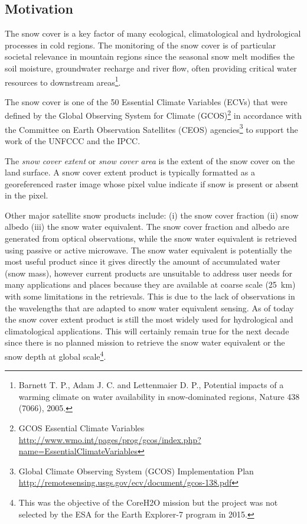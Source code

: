 \documentclass[a4paper]{article}
\begin{document}
\subsection{Motivation}

The snow cover is a key factor of many ecological, climatological and hydrological processes in cold regions. The monitoring of the snow cover is of particular societal relevance in mountain regions since the seasonal snow melt modifies the soil moisture, groundwater recharge and river flow, often providing critical water resources to downstream areas\footnote{Barnett T. P., Adam J. C. and Lettenmaier D. P., Potential impacts of a warming climate on water availability in snow-dominated regions, Nature 438 (7066), 2005.}. 

The snow cover is one of the 50 Essential Climate Variables (ECVs) that were defined by the Global Observing System for Climate (GCOS)\footnote{GCOS Essential Climate Variables  \url{http://www.wmo.int/pages/prog/gcos/index.php?name=EssentialClimateVariables}} in accordance with the Committee on Earth Observation Satellites (CEOS) agencies\footnote{Global Climate Observing System (GCOS) Implementation Plan \url{http://remotesensing.usgs.gov/ecv/document/gcos-138.pdf}} to support the work of the UNFCCC and the IPCC. 

The \textit{snow cover extent} or \textit{snow cover area} is the extent of the snow cover on the land surface. A snow cover extent product is typically formatted as a georeferenced raster image whose pixel value indicate if snow is present or absent in the pixel.

Other major satellite snow products include: (i) the snow cover fraction (ii) snow albedo (iii) the snow water equivalent. The snow cover fraction and albedo are generated from optical observations, while the snow water equivalent is retrieved using passive or active microwave. The snow water equivalent is potentially the most useful product since it gives directly the amount of accumulated water (snow mass), however current products are unsuitable to address user needs for many applications and places because they are available at coarse scale (25~km) with some limitations in the retrievals. This is due to the lack of observations in the wavelengths that are adapted to snow water equivalent sensing. As of today the snow cover extent product is still the most widely used for hydrological and climatological applications. This will certainly remain true for the next decade since there is no planned mission to retrieve the snow water equivalent or the snow depth at global scale\footnote{This was the objective of the CoreH2O mission but the project was not selected by the ESA for the Earth Explorer-7 program in 2015.}. 
\end{document}
